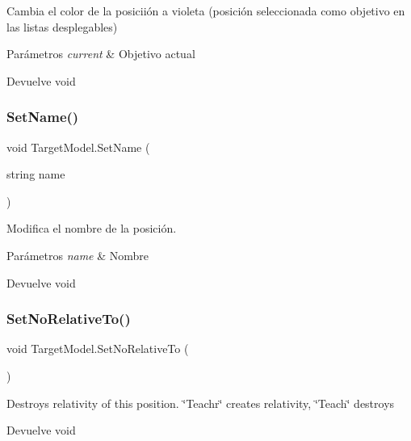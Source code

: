 Cambia el color de la posiciión a violeta (posición seleccionada como objetivo en las listas desplegables) 
\begin{DoxyParams}{Parámetros}
{\em current} & Objetivo actual \\
\hline
\end{DoxyParams}
\begin{DoxyReturn}{Devuelve}
void 
\end{DoxyReturn}
\mbox{\label{class_target_model_a056e89cd27d78b4d7d024d8bc4d0d3cd}} 
\subsubsection{\texorpdfstring{SetName()}{SetName()}}
{\footnotesize\ttfamily void Target\+Model.\+Set\+Name (\begin{DoxyParamCaption}\item[{string}]{name }\end{DoxyParamCaption})\hspace{0.3cm}{\ttfamily [inline]}}

Modifica el nombre de la posición. 
\begin{DoxyParams}{Parámetros}
{\em name} & Nombre \\
\hline
\end{DoxyParams}
\begin{DoxyReturn}{Devuelve}
void 
\end{DoxyReturn}
\mbox{\label{class_target_model_a6f7401c43a6ba1c0f7204dcf66efbed5}} 
\subsubsection{\texorpdfstring{SetNoRelativeTo()}{SetNoRelativeTo()}}
{\footnotesize\ttfamily void Target\+Model.\+Set\+No\+Relative\+To (\begin{DoxyParamCaption}{ }\end{DoxyParamCaption})\hspace{0.3cm}{\ttfamily [inline]}}

Destroys relativity of this position. \char`\"{}\+Teachr\char`\"{} creates relativity, \char`\"{}\+Teach\char`\"{} destroys \begin{DoxyReturn}{Devuelve}
void 
\end{DoxyReturn}
\mbox{\label{class_target_model_a0a23959221104882e778ae3e7d10fe11}} 
